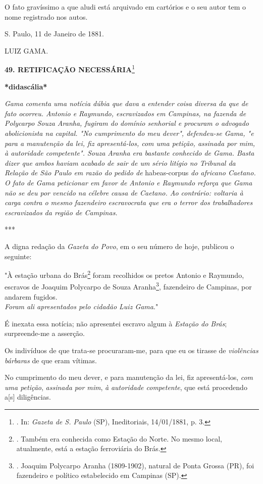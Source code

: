 O fato gravíssimo a que aludi está arquivado em cartórios e o seu autor
tem o nome registrado nos autos.

S. Paulo, 11 de Janeiro de 1881.

LUIZ GAMA.

\textbf{49. RETIFICAÇÃO NECESSÁRIA}\footnote{. In: \emph{Gazeta de S.
  Paulo} (SP), Ineditoriais, 14/01/1881, p. 3.}

\textbf{*didascália*}

\emph{Gama comenta uma notícia dúbia que dava a entender coisa diversa
da que de fato ocorreu. Antonio e Raymundo, escravizados em Campinas, na
fazenda de Polycarpo Souza Aranha, fugiram do domínio senhorial e
procuram o advogado abolicionista na capital. "No cumprimento do meu
dever", defendeu-se Gama, "e para a manutenção da lei, fiz
apresentá-los, com uma petição, assinada por mim, à autoridade
competente". Souza Aranha era bastante conhecido de Gama. Basta dizer
que ambos haviam acabado de sair de um sério litígio no Tribunal da
Relação de São Paulo em razão do pedido de} habeas-corpus \emph{do
africano Caetano. O fato de Gama peticionar em favor de Antonio e
Raymundo reforça que Gama não se deu por vencido na célebre causa de
Caetano. Ao contrário: voltaria à carga contra o mesmo fazendeiro
escravocrata que era o terror dos trabalhadores escravizados da região
de Campinas. }

***

A digna redação da \emph{Gazeta do Povo}, em o seu número de hoje,
publicou o seguinte:

"À estação urbana do Brás\footnote{. Também era conhecida como Estação
  do Norte. No mesmo local, atualmente, está a estação ferroviária do
  Brás.} foram recolhidos os pretos Antonio e Raymundo, escravos de
Joaquim Polycarpo de Souza Aranha\footnote{. Joaquim Polycarpo Aranha
  (1809-1902), natural de Ponta Grossa (PR), foi fazendeiro e político
  estabelecido em Campinas (SP).},
fazendeiro de Campinas, por
andarem fugidos.\\
\emph{Foram ali apresentados pelo cidadão Luiz Gama}."

É inexata essa notícia; não apresentei escravo algum à \emph{Estação do
Brás}; surpreende-me a asserção.

Os indivíduos de que trata-se procuraram-me, para que eu os tirasse de
\emph{violências bárbaras} de que eram vítimas.

No cumprimento do meu dever, e para manutenção da lei, fiz
apresentá-los, \emph{com uma petição}, \emph{assinada por mim}, \emph{à}
\emph{autoridade competente}, que está procedendo a{[}s{]} diligências.

